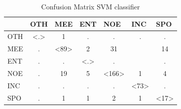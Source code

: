 \documentclass[
10pt, %
a4paper, %
oneside, %
headinclude,footinclude, %
BCOR5mm, %
]{scrartcl}
\begin{document}
\begin{table}[h]
\caption[Confusion Matrix SVM classifier]{Confusion Matrix SVM classifier }
\begin{tabular}{|l|c|c|c|c|c|c|}
\hline
    & \multicolumn{1}{l|}{OTH} & \multicolumn{1}{l|}{MEE} & \multicolumn{1}{l|}{ENT} & \multicolumn{1}{l|}{NOE} & \multicolumn{1}{l|}{INC} & \multicolumn{1}{l|}{SPO} \\ \hline
OTH & \textless.\textgreater   & 1                        & .                        & .                        & .                        & .                        \\ \hline
MEE & .                        & \textless89\textgreater  & 2                        & 31                       &                          & 14                       \\ \hline
ENT & .                        & .                        & \textless.\textgreater   & .                        &                          & .                        \\ \hline
NOE & .                        & 19                       & 5                        & \textless166\textgreater & 1                        & 4                        \\ \hline
INC & .                        & .                        & .                        & .                        & \textless73\textgreater  & .                        \\ \hline
SPO & .                        & 1                        & 1                        & 2                        & 1                        & \textless17\textgreater  \\ \hline
\end{tabular}

\end{table}
\newpage
\end{document}
